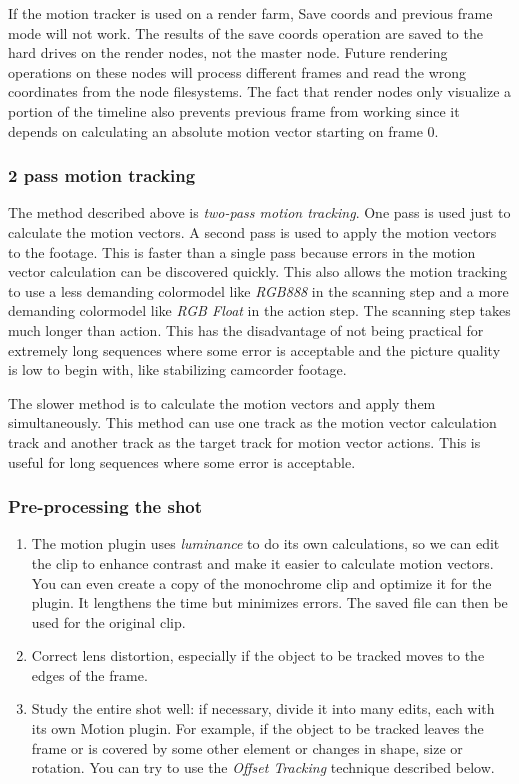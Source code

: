 If the motion tracker is used on a render farm, Save coords and previous frame mode will not work. The results of the save coords operation are saved to the hard drives on the render nodes, not the master node. Future rendering operations on these nodes will process different frames and read the wrong coordinates from the node filesystems. The fact that render nodes only visualize a portion of the timeline also prevents previous frame from working since it depends on calculating an absolute motion vector starting on frame $0$.

\subsubsection*{2 pass motion tracking}
\label{ssub:2_pass_motion_tracking}

The method described above is \textit{two-pass motion tracking}. One pass is used just to calculate the motion vectors. A second pass is used to apply the motion vectors to the footage. This is faster than a single pass because errors in the motion vector calculation can be discovered quickly. This also allows the motion tracking to use a less demanding colormodel like \textit{RGB888} in the scanning step and a more demanding colormodel like \textit{RGB Float} in the action step. The scanning step takes much longer than action. This has the disadvantage of not being practical for extremely long sequences where some error is acceptable and the picture quality is low to begin with, like stabilizing camcorder footage.

The slower method is to calculate the motion vectors and apply them simultaneously. This method can use one track as the motion vector calculation track and another track as the target track for motion vector actions. This is useful for long sequences where some error is acceptable.

\subsubsection*{Pre-processing the shot}
\label{ssub:pre_processing_shot}

\begin{enumerate}
    \item The motion plugin uses \textit{luminance} to do its own calculations, so we can edit the clip to enhance contrast and make it easier to calculate motion vectors. You can even create a copy of the monochrome clip and optimize it for the plugin. It lengthens the time but minimizes errors. The saved file can then be used for the original clip.
    \item  Correct lens distortion, especially if the object to be tracked moves to the edges of the frame.
    \item Study the entire shot well: if necessary, divide it into many edits, each with its own Motion plugin. For example, if the object to be tracked leaves the frame or is covered by some other element or changes in shape, size or rotation. You can try to use the \textit{Offset Tracking} technique described below.
\end{enumerate}

